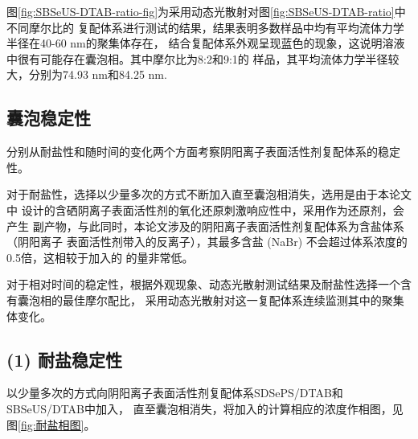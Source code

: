 \documentclass[bachelor,fandolfonts,replaceperiod]{jnuthesis}
\begin{document}
    图\ref{fig:SBSeUS-DTAB-ratio-fig}为采用动态光散射对图\ref{fig:SBSeUS-DTAB-ratio}中不同摩尔比的
    复配体系进行测试的结果，结果表明多数样品中均有平均流体力学半径在40-60 nm的聚集体存在，
    结合复配体系外观呈现蓝色的现象，这说明溶液中很有可能存在囊泡相。其中摩尔比为8:2和9:1的
    样品，其平均流体力学半径较大，分别为74.93 nm和84.25 nm.
    
    \subsection{囊泡稳定性}
    分别从耐盐性和随时间的变化两个方面考察阴阳离子表面活性剂复配体系的稳定性。
    
    对于耐盐性，选择以少量多次的方式不断加入直至囊泡相消失，选用是由于本论文中
    设计的含硒阴离子表面活性剂的氧化还原刺激响应性中，采用作为还原剂，会产生
    副产物，与此同时，本论文涉及的阴阳离子表面活性剂复配体系为含盐体系（阴阳离子
    表面活性剂带入的反离子），其最多含盐 (NaBr) 不会超过体系浓度的0.5倍，这相较于加入的
    的量非常低。
    
    对于相对时间的稳定性，根据外观现象、动态光散射测试结果及耐盐性选择一个含有囊泡相的最佳摩尔配比，
    采用动态光散射对这一复配体系连续监测其中的聚集体变化。
    
    \subsection*{(1) 耐盐稳定性}
    以少量多次的方式向阴阳离子表面活性剂复配体系SDSePS/DTAB和SBSeUS/DTAB中加入，
    直至囊泡相消失，将加入的计算相应的浓度作相图，见图\ref{fig:耐盐相图}。
\end{document}
